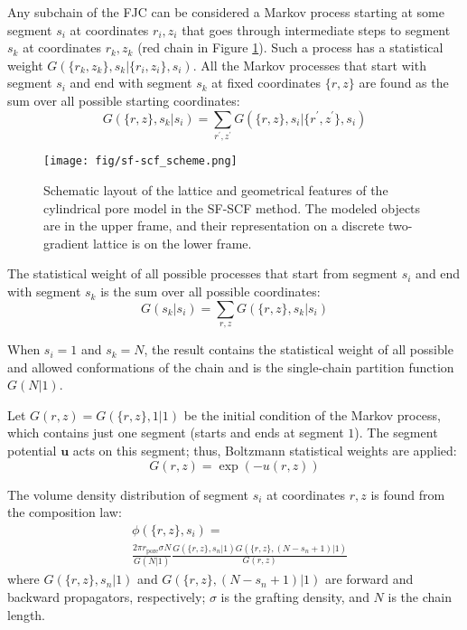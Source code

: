 \documentclass[10pt, a4paper]{article}
\begin{document}
\begin{multicols}{2}
Any subchain of the FJC can be considered a Markov process starting at some segment $s_i$ at coordinates $r_i, z_i$ that goes through intermediate steps to segment $s_k$ at coordinates $r_k, z_k$ (red chain in Figure \ref{fig:sf-scf_scheme}).
Such a process has a statistical weight $G(\{r_k, z_k\}, s_k | \{r_i, z_i\}, s_i)$.
All the Markov processes that start with segment $s_i$ and end with segment $s_k$ at fixed coordinates $\{r, z\}$ are found as the sum over all possible starting coordinates:
\begin{equation}
    \label{eq:sum_to_phi}
    G(\{r, z\}, s_k | s_i) = \sum_{r^{\prime}, z^{\prime}} G(\{r, z\}, s_i | \{r^{\prime}, z^{\prime}\}, s_i)
\end{equation}

\begin{figure}[H]
    \centering
    \texttt{[image: fig/sf-scf\_scheme.png]}
    \caption{
    Schematic layout of the lattice and geometrical features of the cylindrical pore model in the SF-SCF method.
    The modeled objects are in the upper frame, and their representation on a discrete two-gradient lattice is on the lower frame.
    }
\label{fig:sf-scf_scheme}
\end{figure}

The statistical weight of all possible processes that start from segment $s_i$ and end with segment $s_k$ is the sum over all possible coordinates:
\begin{equation}
    G(s_k | s_i) = \sum_{r, z} G(\{r, z\}, s_k | s_i)
\end{equation}

When $s_i=1$ and $s_k=N$, the result contains the statistical weight of all possible and allowed conformations of the chain and is the single-chain partition function $G(N|1)$.

Let $G(r, z) = G(\{r, z\}, 1|1)$ be the initial condition of the Markov process, which contains just one segment (starts and ends at segment $1$).
The segment potential $\mathbf{u}$ acts on this segment; thus, Boltzmann statistical weights are applied:
\begin{equation}
    G(r, z) = \exp(-u(r,z))
\end{equation}

The volume density distribution of segment $s_i$ at coordinates $r, z$ is found from the composition law:
\begin{equation}
    \label{eq:propagation}
    \begin{aligned}
        &\phi(\{r, z\}, s_i) = \\
        &\frac{2 \pi r_{\textrm{pore}} \sigma N}{G(N|1)}
        \frac{G(\{r, z\}, s_n | 1) G(\{r, z\}, (N - s_n + 1) | 1)}{G(r, z)}
    \end{aligned}
\end{equation}
where $G(\{r, z\}, s_n | 1)$ and $G(\{r, z\}, (N - s_n + 1) | 1)$ are forward and backward propagators, respectively; $\sigma$ is the grafting density, and $N$ is the chain length.


\end{multicols}
\end{document}
